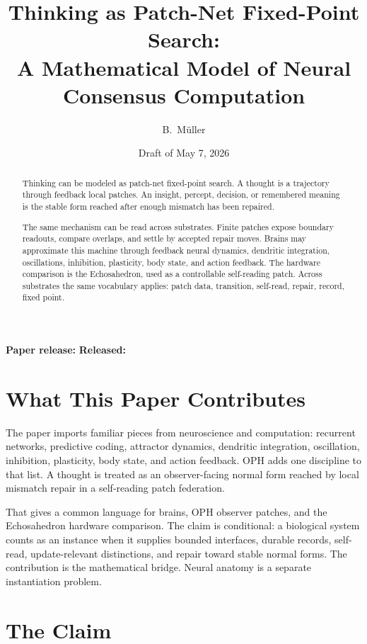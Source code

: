\documentclass[11pt]{article}
\title{Thinking as Patch-Net Fixed-Point Search:\\
A Mathematical Model of Neural Consensus Computation}
\author{B.\ M\"uller}
\date{Draft of May 7, 2026}
\theoremstyle{remark}
\theoremstyle{plain}
\begin{document}
\maketitle
\begin{center}
\small\textbf{Paper release:} \OPHPaperReleaseID\quad
\textbf{Released:} \OPHPaperReleaseDate
\end{center}

\begin{abstract}
Thinking can be modeled as patch-net fixed-point search. A thought is a trajectory through feedback local patches. An insight, percept, decision, or remembered meaning is the stable form reached after enough mismatch has been repaired.

The same mechanism can be read across substrates. Finite patches expose boundary readouts, compare overlaps, and settle by accepted repair moves. Brains may approximate this machine through feedback neural dynamics, dendritic integration, oscillations, inhibition, plasticity, body state, and action feedback. The hardware comparison is the Echosahedron, used as a controllable self-reading patch. Across substrates the same vocabulary applies: patch data, transition, self-read, repair, record, fixed point.
\end{abstract}

\section*{What This Paper Contributes}

The paper imports familiar pieces from neuroscience and computation: recurrent
networks, predictive coding, attractor dynamics, dendritic integration,
oscillation, inhibition, plasticity, body state, and action feedback. OPH adds
one discipline to that list. A thought is treated as an observer-facing normal
form reached by local mismatch repair in a self-reading patch federation.

That gives a common language for brains, OPH observer patches, and the
Echosahedron hardware comparison. The claim is conditional: a biological
system counts as an instance when it supplies bounded interfaces, durable
records, self-read, update-relevant distinctions, and repair toward stable
normal forms. The contribution is the mathematical bridge. Neural anatomy is a
separate instantiation problem.

\tableofcontents

\section{The Claim}
\end{document}
